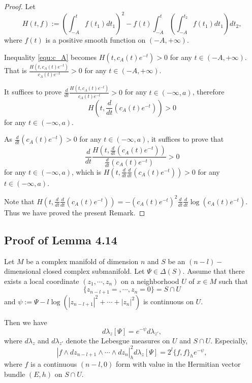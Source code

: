 \documentclass[twoside,openany,12pt]{beautynote}
\begin{document}
\begin{proof}
  Let
  \begin{equation}
    \label{eq:set_function}
    H(t,f):=\left(\int_{-A}^{t}f(t_{1})dt_{1}\right)^{2}-f(t)\int_{-A}^{t}\left(\int_{-A}^{t_{2}}f(t_{1})dt_{1}\right)dt_{2},
  \end{equation}
  where $f(t)$ is a positive smooth function on $(-A,+\infty)$.
  
  Inequality \ref{equ:c_A} becomes $H(t,c_{A}(t)e^{-t})>0$ for any $t\in(-A,+\infty)$.
  That is $\frac{H(t,c_{A}(t)e^{-t})}{c_{A}(t)e^{-t}}>0$ for any $t\in(-A,+\infty)$.
  
  It suffices to prove
  $\frac{d}{dt}\frac{H(t,c_{A}(t)e^{-t})}{c_{A}(t)e^{-t}}>0$ for any
  $t\in(-\infty,a)$, therefore $$H(t,\frac{d}{dt}(c_{A}(t)e^{-t}))>0$$
  for any $t\in(-\infty,a)$.
  
  As $\frac{d}{dt}(c_{A}(t)e^{-t})>0$ for any $t\in(-\infty,a)$, it suffices to prove that
  $$\frac{d}{dt}\frac{H(t,\frac{d}{dt}(c_{A}(t)e^{-t}))}{\frac{d}{dt}(c_{A}(t)e^{-t})}>0$$ for any $t\in(-\infty,a)$,
  which is $H(t,\frac{d}{dt}\frac{d}{dt}(c_{A}(t)e^{-t}))>0$ for any $t\in(-\infty,a)$.
  
  Note that $H(t,\frac{d}{dt}\frac{d}{dt}(c_{A}(t)e^{-t}))=
  -(c_{A}(t)e^{-t})^{2}\frac{d}{dt}\frac{d}{dt}\log(c_{A}(t)e^{-t})$.
  Thus we have proved the present Remark.
  \end{proof}

\subsection{Proof of Lemma 4.14}

\begin{lemma}\label{l:lem9}
  Let $M$ be a complex manifold of dimension $n$ and $S$ be an
  $(n-l)-$dimensional closed complex submanifold. Let
  $\Psi\in\Delta(S)$. Assume that there exists a local coordinate
  $(z_{1},\cdots,z_{n})$ on a neighborhood $U$ of $x\in M$ such that
  \[
    \{z_{n-l+1}=,\cdots,z_{n}=0\}=S\cap U 
  \]
  and $\psi:=\Psi-l\log(|z_{n-l+1}|^{2}+\cdots+|z_{n}|^{2}) $ is continuous
  on $U$.

  Then we have $$d\lambda_{z}[\Psi]=e^{-\psi}d\lambda_{z'},$$
  where $d\lambda_{z}$ and $d\lambda_{z'}$ denote the Lebesgue
  measures on $U$ and $S\cap U$. Especially,
  $$|f\wedge dz_{n-l+1}\wedge\cdots\wedge dz_{n}|^{2}_{h}d\lambda_{z}[\Psi]
  =2^{l}\{f, f\}_{h}e^{-\psi},$$ where $f$ is a continuous $(n-l,0)$
  form with value in the Hermitian vector bundle $(E,h)$ on $S\cap U$.
  \end{lemma}
  
\end{document}
